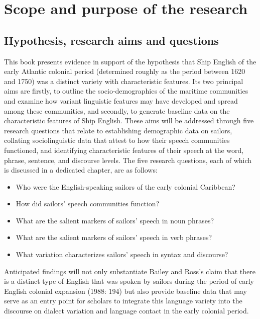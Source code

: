 \section{\textbf{Scope} \textbf{and} \textbf{purpose} \textbf{of} \textbf{the} \textbf{research}  }%



\subsection{\textbf{Hypothesis,} \textbf{research} \textbf{aims} \textbf{and} \textbf{questions}}%



This book presents evidence in support of the hypothesis that Ship English of the early Atlantic colonial period (determined roughly as the period between 1620 and 1750) was a distinct variety with characteristic features. Its two principal aims are firstly, to outline the socio-demographics of the maritime communities and examine how variant linguistic features may have developed and spread among these communities, and secondly, to generate baseline data on the characteristic features of Ship English. These aims will be addressed through five research questions that relate to establishing demographic data on sailors, collating sociolinguistic data that attest to how their speech communities functioned, and identifying characteristic features of their speech at the word, phrase, sentence, and discourse levels. The five research questions, each of which is discussed in a dedicated chapter, are as follows:


\begin{itemize}
\item Who were the English-speaking sailors of the early colonial Caribbean?
\item How did sailors’ speech communities function?
\item What are the salient markers of sailors’ speech in noun phrases?
\item What are the salient markers of sailors’ speech in verb phrases?
\item What variation characterizes sailors’ speech in syntax and discourse?
\end{itemize}

Anticipated findings will not only substantiate Bailey and Ross’s claim that there is a distinct type of English that was spoken by sailors during the period of early English colonial expansion (1988: 194) but also provide baseline data that may serve as an entry point for scholars to integrate this language variety into the discourse on dialect variation and language contact in the early colonial period. 


